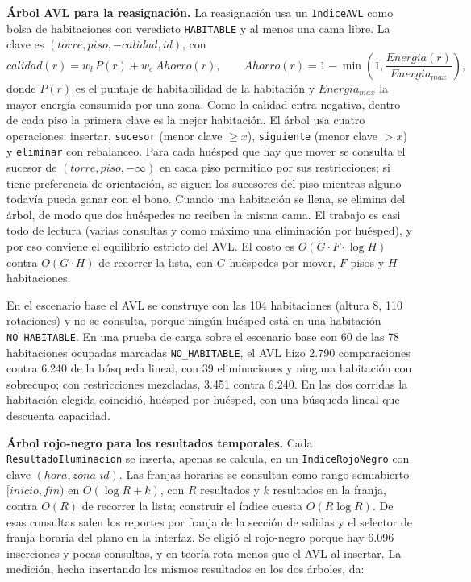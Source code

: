 \documentclass[12pt,a4paper]{article}
\newcommand{\clase}[1]{\texttt{#1}}
\newcommand{\estado}[1]{\texttt{#1}}
\newcommand{\codigo}[1]{\texttt{#1}}
\begin{document}
\textbf{Árbol AVL para la reasignación.} La reasignación usa un \clase{IndiceAVL} como bolsa de habitaciones con veredicto \estado{HABITABLE} y al menos una cama libre. La clave es $(torre, piso, -calidad, id)$, con
\begin{equation}
 calidad(r)=w_l\,P(r)+w_e\,Ahorro(r),\qquad Ahorro(r)=1-\min\left(1,\frac{Energia(r)}{Energia_{max}}\right),
 \label{eq:calidad}
\end{equation}
donde $P(r)$ es el puntaje de habitabilidad de la habitación y $Energia_{max}$ la mayor energía consumida por una zona. Como la calidad entra negativa, dentro de cada piso la primera clave es la mejor habitación. El árbol usa cuatro operaciones: insertar, \codigo{sucesor} (menor clave $\geq x$), \codigo{siguiente} (menor clave $>x$) y \codigo{eliminar} con rebalanceo. Para cada huésped que hay que mover se consulta el sucesor de $(torre, piso, -\infty)$ en cada piso permitido por sus restricciones; si tiene preferencia de orientación, se siguen los sucesores del piso mientras alguno todavía pueda ganar con el bono. Cuando una habitación se llena, se elimina del árbol, de modo que dos huéspedes no reciben la misma cama. El trabajo es casi todo de lectura (varias consultas y como máximo una eliminación por huésped), y por eso conviene el equilibrio estricto del AVL. El costo es $O(G\cdot F\cdot\log H)$ contra $O(G\cdot H)$ de recorrer la lista, con $G$ huéspedes por mover, $F$ pisos y $H$ habitaciones.

En el escenario base el AVL se construye con las 104 habitaciones (altura 8, 110 rotaciones) y no se consulta, porque ningún huésped está en una habitación \estado{NO\_HABITABLE}. En una prueba de carga sobre el escenario base con 60 de las 78 habitaciones ocupadas marcadas \estado{NO\_HABITABLE}, el AVL hizo 2.790 comparaciones contra 6.240 de la búsqueda lineal, con 39 eliminaciones y ninguna habitación con sobrecupo; con restricciones mezcladas, 3.451 contra 6.240. En las dos corridas la habitación elegida coincidió, huésped por huésped, con una búsqueda lineal que descuenta capacidad.

\textbf{Árbol rojo-negro para los resultados temporales.} Cada \clase{ResultadoIluminacion} se inserta, apenas se calcula, en un \clase{IndiceRojoNegro} con clave $(hora, zona\_id)$. Las franjas horarias se consultan como rango semiabierto $[inicio, fin)$ en $O(\log R+k)$, con $R$ resultados y $k$ resultados en la franja, contra $O(R)$ de recorrer la lista; construir el índice cuesta $O(R\log R)$. De esas consultas salen los reportes por franja de la sección de salidas y el selector de franja horaria del plano en la interfaz. Se eligió el rojo-negro porque hay 6.096 inserciones y pocas consultas, y en teoría rota menos que el AVL al insertar. La medición, hecha insertando los mismos resultados en los dos árboles, da:
\end{document}
